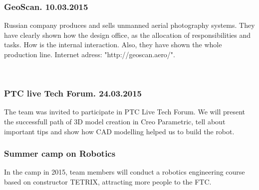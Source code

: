     \subsubsection{GeoScan. 10.03.2015}
    Russian company produces and sells unmanned aerial photography systems. They have clearly shown how the design office, as the allocation of responsibilities and tasks. How is the internal interaction. Also, they have shown the whole production line. Internet adress: "http://geoscan.aero/".
    \begin{figure}[H]
    	\\	
    \end{figure}
	\subsubsection{PTC live Tech Forum. 24.03.2015}
	 The team was invited to participate in PTC Live Tech Forum. We will present the successfull path of 3D model creation in Creo Parametric, tell about important tips and show how CAD modelling helped us to build the robot.
	
	\subsubsection{Summer camp on Robotics}
	In the camp in 2015, team members will conduct a robotics engineering course based on constructor TETRIX, attracting more people to the FTC.
	
	\fillpage
		
		
		
		
		
		
		
		
		